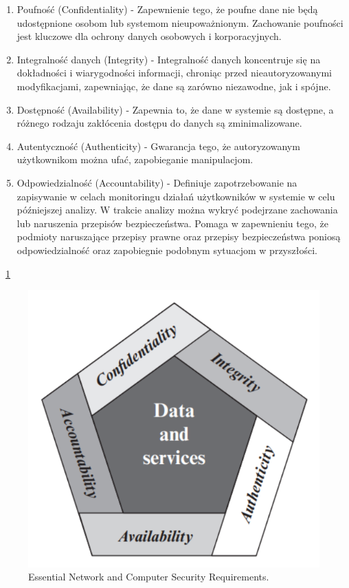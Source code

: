 \documentclass[runningheads,12pt]{llncs}
\begin{document}
\begin{enumerate}
    \item Poufność (Confidentiality) - Zapewnienie tego, że poufne dane nie będą udostępnione osobom lub systemom nieupoważnionym. Zachowanie poufności jest kluczowe dla ochrony danych osobowych i korporacyjnych. ~\cite[p. 22]{stallings2017cryptography}
    \item Integralność danych (Integrity) - Integralność danych koncentruje się na dokładności i wiarygodności informacji, chroniąc przed nieautoryzowanymi modyfikacjami, zapewniając, że dane są zarówno niezawodne, jak i spójne.  ~\cite[p. 22]{stallings2017cryptography}
    \item Dostępność (Availability) - Zapewnia to, że dane w systemie są dostępne, a różnego rodzaju zakłócenia dostępu do danych są zminimalizowane.  ~\cite[p. 22]{stallings2017cryptography}
    \item Autentyczność (Authenticity) - Gwarancja tego, że autoryzowanym użytkownikom można ufać, zapobieganie manipulacjom. ~\cite[p. 23]{stallings2017cryptography}
    \item Odpowiedzialność (Accountability) - Definiuje zapotrzebowanie na zapisywanie w celach monitoringu działań użytkowników w systemie w celu późniejszej analizy. W trakcie analizy można wykryć podejrzane zachowania lub naruszenia przepisów bezpieczeństwa. Pomaga w zapewnieniu tego, że podmioty naruszające przepisy prawne oraz przepisy bezpieczeństwa poniosą odpowiedzialność oraz zapobiegnie podobnym sytuacjom w przyszłości. ~\cite[p. 23]{stallings2017cryptography}
\end{enumerate}


~\ref{fig1}

\begin{figure}
    \includegraphics[width=\linewidth]{images/image-security.png}
    \caption{Essential Network and Computer Security Requirements.} \label{fig1}
\end{figure}
\end{document}
